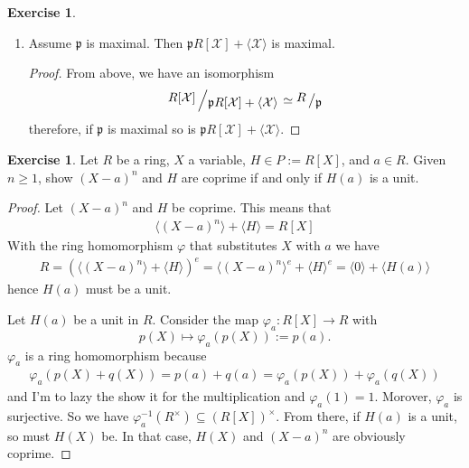 \documentclass{book}
\theoremstyle{plain}
\theoremstyle{definition}
\newtheorem{exr}[thm]{Exercise}
\theoremstyle{custom_definition}
\newcommand{\bigslant}[2]{{\raisebox{.2em}{$#1$}\left/\raisebox{-.2em}{$#2$}\right.}}
\begin{document}
\begin{exr}
\begin{enumerate}
\begin{proof}
      Again for the contraction we have \(\varphi^{-1}(\mathfrak{p}R[\mathcal{X}] + \langle \mathcal{X} \rangle) = \mathfrak{p}\) (because we are basically only caring about \(a_0\)).
    \end{proof}
    \item Assume \(\mathfrak{p}\) is maximal. Then \(\mathfrak{p}R[\mathcal{X}] + \langle \mathcal{X} \rangle\) is maximal.
    \begin{proof}
      From above, we have an isomorphism
      \begin{equation}
        \bigslant{R[\mathcal{X}]}{\mathfrak{p}R[\mathcal{X}]+ \langle \mathcal{X} \rangle} \simeq \bigslant{R}{\mathfrak{p}}
      \end{equation}
      therefore, if \(\mathfrak{p}\) is maximal so is \(\mathfrak{p}R[\mathcal{X}] + \langle \mathcal{X} \rangle\).
    \end{proof}
  \end{enumerate}
\end{exr}

\begin{exr}
  Let \(R\) be a ring, \(X\) a variable, \(H \in P := R[X]\), and \(a \in R\). Given \(n \geq 1\), show \((X - a)^n\) and \(H\) are coprime if and only if \(H(a)\) is a unit.
\end{exr}
\begin{proof}
  Let \((X - a)^n\) and \(H\) be coprime. This means that
  \begin{align}
    \langle (X - a)^n \rangle + \langle H \rangle = R[X]
  \end{align}
  With the ring homomorphism \(\varphi\) that substitutes \(X\) with \(a\) we have
  \begin{align}
    R = \left( \langle (X - a)^n \rangle + \langle H \rangle \right)^e = \langle (X - a)^n \rangle^e + \langle H \rangle^e = \langle 0 \rangle + \langle H(a) \rangle 
  \end{align}
  hence \(H(a)\) must be a unit.

  Let \(H(a)\) be a unit in \(R\). Consider the map \(\varphi_a: R[X] \longrightarrow R\) with
  \begin{equation}
    p(X) \mapsto \varphi_a(p(X)) := p(a) \text{.}
  \end{equation}
  \(\varphi_a\) is a ring homomorphism because
  \begin{align}
    \varphi_a(p(X) + q(X)) = p(a) + q(a) = \varphi_a(p(X)) + \varphi_a(q(X))
  \end{align}
  and I'm to lazy the show it for the multiplication and \(\varphi_a(1) = 1\). Morover, \(\varphi_a\) is surjective. So we have \(\varphi^{-1}_a(R^\times) \subseteq (R[X])^\times\). From there, if \(H(a)\) is a unit, so must \(H(X)\) be. In that case, \(H(X)\) and \((X - a)^n\) are obviously coprime.
\end{proof}
\end{document}
